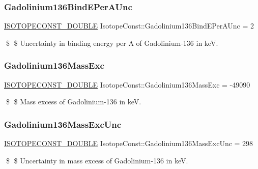 \subsubsection{\texorpdfstring{Gadolinium136\+Bind\+E\+Per\+A\+Unc}{Gadolinium136BindEPerAUnc}}
{\footnotesize\ttfamily \mbox{\hyperlink{group___isotope_const-_macros_ga8f45a7272ce02c0b4c65c44636ed719a}{I\+S\+O\+T\+O\+P\+E\+C\+O\+N\+S\+T\+\_\+\+D\+O\+U\+B\+LE}} Isotope\+Const\+::\+Gadolinium136\+Bind\+E\+Per\+A\+Unc = 2}

\$ \$ Uncertainty in binding energy per A of Gadolinium-\/136 in keV. \mbox{\label{group___isotope_const-_gadolinium-_gd136_gae98b64f656a8573708549ad0cc635ec3}} 
\subsubsection{\texorpdfstring{Gadolinium136\+Mass\+Exc}{Gadolinium136MassExc}}
{\footnotesize\ttfamily \mbox{\hyperlink{group___isotope_const-_macros_ga8f45a7272ce02c0b4c65c44636ed719a}{I\+S\+O\+T\+O\+P\+E\+C\+O\+N\+S\+T\+\_\+\+D\+O\+U\+B\+LE}} Isotope\+Const\+::\+Gadolinium136\+Mass\+Exc = -\/49090}

\$ \$ Mass excess of Gadolinium-\/136 in keV. \mbox{\label{group___isotope_const-_gadolinium-_gd136_gad1fac0a3f36b895cccc48364f8096b95}} 
\subsubsection{\texorpdfstring{Gadolinium136\+Mass\+Exc\+Unc}{Gadolinium136MassExcUnc}}
{\footnotesize\ttfamily \mbox{\hyperlink{group___isotope_const-_macros_ga8f45a7272ce02c0b4c65c44636ed719a}{I\+S\+O\+T\+O\+P\+E\+C\+O\+N\+S\+T\+\_\+\+D\+O\+U\+B\+LE}} Isotope\+Const\+::\+Gadolinium136\+Mass\+Exc\+Unc = 298}

\$ \$ Uncertainty in mass excess of Gadolinium-\/136 in keV. \mbox{\label{group___isotope_const-_gadolinium-_gd136_gad8abaaff7b7fc3d4dc0379a844b809d7}} 
